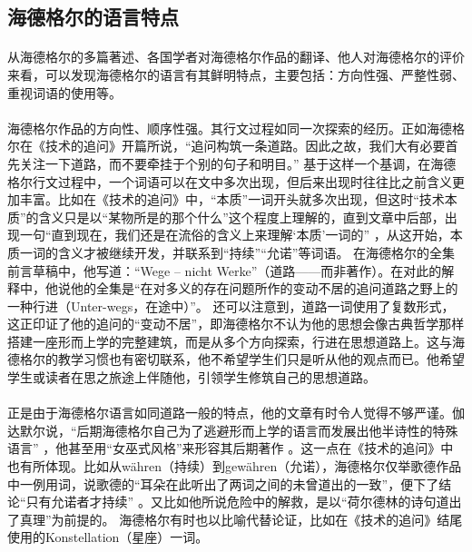 \documentclass{article}
\begin{document}
	\subsection{海德格尔的语言特点}
		\paragraph{}
		从海德格尔的多篇著述、各国学者对海德格尔作品的翻译、他人对海德格尔的评价来看，可以发现海德格尔的语言有其鲜明特点，主要包括：方向性强、严整性弱、重视词语的使用等。
		\paragraph{}
		海德格尔作品的方向性、顺序性强。其行文过程如同一次探索的经历。正如海德格尔在《技术的追问》开篇所说，“追问构筑一条道路。因此之故，我们大有必要首先关注一下道路，而不要牵挂于个别的句子和明目。”
\cite{slct_Hei_Szx}
基于这样一个基调，在海德格尔行文过程中，一个词语可以在文中多次出现，但后来出现时往往比之前含义更加丰富。比如在《技术的追问》中，“本质”一词开头就多次出现，但这时“技术本质”的含义只是以“某物所是的那个什么”这个程度上理解的，直到文章中后部，出现一句“直到现在，我们还是在流俗的含义上来理解‘本质’一词的”
\cite{slct_Hei_Szx}
，从这开始，本质一词的含义才被继续开发，并联系到“持续”“允诺”等词语。
在海德格尔的全集前言草稿中，他写道：“Wege – nicht Werke”（道路——而非著作）。在对此的解释中，他说他的全集是“在对多义的存在问题所作的变动不居的追问道路之野上的一种行进（Unter-wegs，在途中）”。
\cite{sprach_sein_Szx}
还可以注意到，道路一词使用了复数形式，这正印证了他的追问的“变动不居”，即海德格尔不认为他的思想会像古典哲学那样搭建一座形而上学的完整建筑，而是从多个方向探索，行进在思想道路上。这与海德格尔的教学习惯也有密切联系，他不希望学生们只是听从他的观点而已。他希望学生或读者在思之旅途上伴随他，引领学生修筑自己的思想道路。
		\paragraph{}
		正是由于海德格尔语言如同道路一般的特点，他的文章有时令人觉得不够严谨。伽达默尔说，“后期海德格尔自己为了逃避形而上学的语言而发展出他半诗性的特殊语言”
\cite{Text_Explain_DeFr}
，他甚至用“女巫式风格”来形容其后期著作
\cite[pg. 113]{Deonstr_DeFr}
。这一点在《技术的追问》中也有所体现。比如从währen（持续）到gewähren（允诺），海德格尔仅举歌德作品中一例用词，说歌德的“耳朵在此听出了两词之间的未曾道出的一致”，便下了结论“只有允诺者才持续”
。又比如他所说危险中的解救，是以“荷尔德林的诗句道出了真理”为前提的\cite{slct_Hei_Szx}。
海德格尔有时也以比喻代替论证，比如在《技术的追问》结尾使用的Konstellation（星座）一词。
\end{document}
